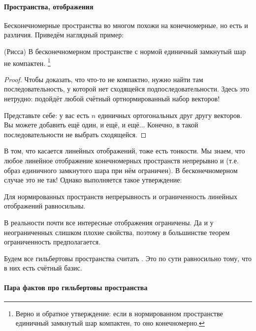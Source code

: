 \documentclass{trlnotes}
\begin{document}
    \paragraph{Пространства, отображения}
    Бесконечномерные пространства во многом похожи на конечномерные, но есть и различия. Приведём наглядный пример:

    \begin{thm}(Рисса)
        В бесконечномерном пространстве с нормой единичный замкнутый шар не компактен. \footnote{Верно и обратное утверждение: если в нормированном пространстве единичный замкнутый шар компактен, то оно конечномерно.}
        \begin{proof}
            Чтобы доказать, что что-то не компактно, нужно найти там последовательность, у которой нет сходящейся подпоследовательности. Здесь это нетрудно: подойдёт любой счётный ортнормированный набор векторов!

            Представьте себе: у вас есть $n$ единичных ортогональных друг другу векторов. Вы можете добавить ещё один, и ещё, и ещё... Конечно, в такой последовательности не выбрать сходящейся.
        \end{proof}
    \end{thm}

    В том, что касается линейных отображений, тоже есть тонкости. Мы знаем, что любое линейное отображение конечномерных пространств непрерывно и  (т.е. образ единичного замкнутого шара при нём ограничен). В бесконечномерном случае это не так! Однако выполняется такое утверждение:

    \begin{st}
        Для нормированных пространств непрерывность и ограниченность линейных отображений равносильны.
    \end{st}

    В реальности почти все интересные отображения ограничены. Да и у неограниченных слишком плохие свойства, поэтому в большинстве теорем ограниченность предполагается.

    \begin{rem}
        Будем все гильбертовы пространства считать . Это по сути равносильно тому, что в них есть счётный базис.
    \end{rem}


    \paragraph{Пара фактов про гильбертовы пространства}
\end{document}
